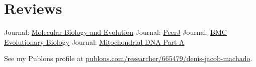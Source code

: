 
\section{Reviews}
		{Journal: \href{https://academic.oup.com/mbe}{Molecular Biology and Evolution}}
	\cvline{--}
		{Journal: \href{https://peerj.com/}{PeerJ}}
	\cvline{--}
		{Journal: \href{https://bmcevolbiol.biomedcentral.com/}{BMC Evolutionary Biology}}
		{Journal: \href{https://www.tandfonline.com/loi/imdn20}{Mitochondrial DNA Part A}}

\vspace{0.5em}

See my Publons profile at \href{https://publons.com/researcher/665479/denis-jacob-machado/}{publons.com/researcher/665479/denis-jacob-machado}.
